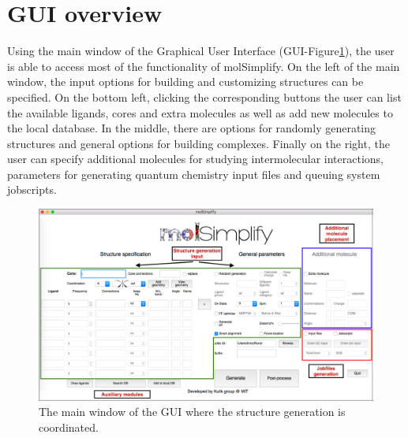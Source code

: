 \documentclass[a4paper,12pt]{assignment}
\begin{document}
\maketitle

\tableofcontents

\clearpage







\newpage

\section{GUI overview}

Using the main window of the Graphical User Interface (GUI-Figure\ref{GUIov}), the user is able to access most of the functionality of molSimplify. On the left of the main window, the input options for building and customizing structures can be specified. On the bottom left, clicking the corresponding buttons the user can list the available ligands, cores and extra molecules as well as add new molecules to the local database. In the middle, there are options for randomly generating structures and general options for building complexes. Finally on the right, the user can specify additional molecules for studying intermolecular interactions, parameters for generating quantum chemistry input files and queuing system jobscripts.

\begin{figure}[htb!]
\centering
\includegraphics[width=\textwidth]{./Figures/fig0.png}
\caption{The main window of the GUI where the structure generation is coordinated.}
\label{GUIov}
\end{figure}
\end{document}
